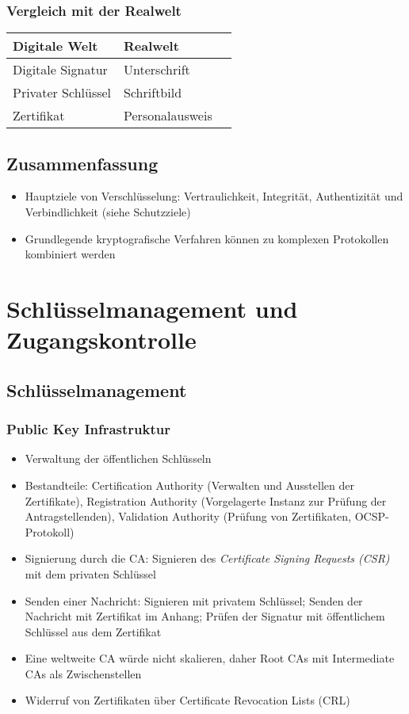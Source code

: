 \subsubsection{Vergleich mit der Realwelt}

\begin{tabularx}{\columnwidth}{|X|X|l}
	\hline
	\textbf{Digitale Welt} & \textbf{Realwelt} \\
	\hline
	Digitale Signatur & Unterschrift \\
	Privater Schlüssel & Schriftbild \\
	Zertifikat & Personalausweis \\
	\hline
\end{tabularx}


\subsection{Zusammenfassung}
\begin{itemize}
	\item Hauptziele von Verschlüsselung: Vertraulichkeit, Integrität, Authentizität und Verbindlichkeit (siehe Schutzziele)
	\item Grundlegende kryptografische Verfahren können zu komplexen Protokollen kombiniert werden
\end{itemize}



\section{Schlüsselmanagement und Zugangskontrolle}

\subsection{Schlüsselmanagement}

\subsubsection{Public Key Infrastruktur}
\begin{itemize}
	\item Verwaltung der öffentlichen Schlüsseln
	\item Bestandteile: Certification Authority (Verwalten und Ausstellen der Zertifikate), Registration Authority (Vorgelagerte Instanz zur Prüfung der Antragstellenden), Validation Authority (Prüfung von Zertifikaten, OCSP-Protokoll)
	\item Signierung durch die CA: Signieren des \textit{Certificate Signing Requests (CSR)} mit dem privaten Schlüssel
	\item Senden einer Nachricht: Signieren mit privatem Schlüssel; Senden der Nachricht mit Zertifikat im Anhang; Prüfen der Signatur mit öffentlichem Schlüssel aus dem Zertifikat
	\item Eine weltweite CA würde nicht skalieren, daher Root CAs mit Intermediate CAs als Zwischenstellen
	\item Widerruf von Zertifikaten über Certificate Revocation Lists (CRL)
\end{itemize}


